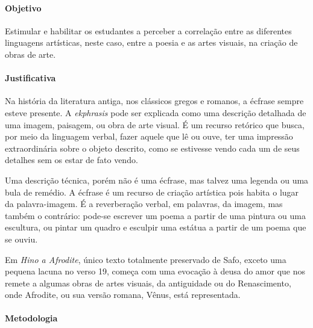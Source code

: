\documentclass[12pt]{extarticle}
\begin{document}
\paragraph{Objetivo} Estimular e habilitar os estudantes a perceber a 
correlação entre as diferentes linguagens artísticas, neste caso, entre a 
poesia e as artes visuais, na criação de obras de arte. 

\paragraph{Justificativa} Na história da literatura antiga, nos clássicos gregos
e romanos, a écfrase sempre esteve presente. A \textit{ekphrasis} pode ser 
explicada como uma descrição detalhada de uma imagem, paisagem, ou obra de 
arte visual. É um recurso retórico que busca, por meio da linguagem verbal, 
fazer aquele que lê ou ouve, ter uma impressão extraordinária sobre o objeto 
descrito, como se estivesse vendo cada um de seus detalhes sem os estar de fato vendo.

Uma descrição técnica, porém não é uma écfrase, mas talvez uma legenda ou uma
bula de remédio. A écfrase é um recurso de criação artística pois habita o lugar 
da palavra-imagem. É a reverberação verbal, em palavras, da imagem, mas também 
o contrário: pode-se escrever um poema a partir de uma pintura ou uma escultura, 
ou pintar um quadro e esculpir uma estátua a partir de um poema que se ouviu. 

Em \textit{Hino a Afrodite}, único texto totalmente preservado de Safo, exceto 
uma pequena lacuna no verso 19, começa com uma evocação à deusa do amor que
nos remete a algumas obras de artes visuais, da antiguidade ou do Renascimento,
onde Afrodite, ou sua versão romana, Vênus, está representada. 

\paragraph{Metodologia} 
\end{document}
